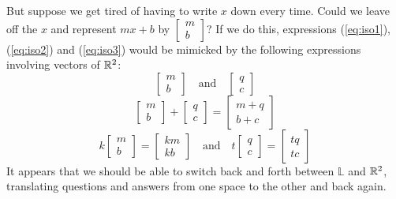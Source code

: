 \documentclass{ximera}
\begin{document}
But suppose we get tired of having to write  $x$ down every time.  Could we leave off the $x$ and represent $mx+b$ by  $\begin{bmatrix}m\\b\end{bmatrix}$?  If we do this, expressions (\ref{eq:iso1}), (\ref{eq:iso2}) and (\ref{eq:iso3}) would be mimicked by the following expressions involving vectors of $\mathbb{R}^2$:
$$\begin{bmatrix}m\\b\end{bmatrix}\quad\text{and}\quad\begin{bmatrix}q\\c\end{bmatrix}$$
$$\begin{bmatrix}m\\b\end{bmatrix}+\begin{bmatrix}q\\c\end{bmatrix}=\begin{bmatrix}m+q\\b+c\end{bmatrix}$$
$$k\begin{bmatrix}m\\b\end{bmatrix}=\begin{bmatrix}km\\kb\end{bmatrix}\quad\text{and}\quad t\begin{bmatrix}q\\c\end{bmatrix}=\begin{bmatrix}tq\\tc\end{bmatrix}$$
It appears that we should be able to switch back and forth between $\mathbb{L}$ and $\mathbb{R}^2$, translating questions and answers from one space to the other and back again.  
\end{document}
